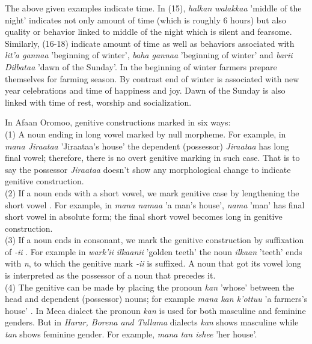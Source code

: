 \documentclass[11pt,a4paper]{article}
\begin{document}
	The above given examples indicate time. In (15), \emph{halkan walakkaa} 'middle of the night' indicates not only amount of time (which is roughly 6 hours) but also quality or behavior linked to middle of the night which is silent and fearsome. Similarly, (16-18) indicate amount of time as well as behaviors associated with \emph{lit'a gannaa} 'beginning of winter', \emph{baha gannaa} 'beginning of winter' and \emph{barii Dilbataa} 'dawn of the Sunday'. In the beginning of winter farmers prepare themselves for farming season. By contrast end of winter is associated with new year celebrations and time of happiness and joy. Dawn of the Sunday is also linked with time of rest, worship and socialization. 
		
	In Afaan Oromoo, genitive constructions marked in six ways:\\
	
	(1) A noun ending in long vowel marked by null morpheme. For example,  in \emph{mana Jiraataa} 'Jiraataa's house' the dependent (possessor) \emph{Jiraataa} has long final vowel; therefore, there is no overt genitive marking in such case. That is to say the possessor \emph{Jiraataa} doesn't show any morphological change to indicate genitive construction. \\
	
	(2) If a noun ends with a short vowel, we mark genitive case by lengthening the short vowel \cite[183]{gragg1976oromo,gobena2019verb}. For example, in \emph{mana namaa} 'a man's house', \emph{nama} 'man' has final short vowel in absolute form; the final short vowel becomes long in genitive construction. \\
	
	(3) If a noun ends in consonant, we mark the genitive construction by suffixation of \emph{-ii} \cite{gobena2019verb}. For example in \emph{wark'ii ilkaanii} 'golden teeth' the noun \emph{ilkaan} 'teeth' ends with \emph{n}, to which the genitive mark \emph{-ii} is suffixed. A noun that got its vowel long is interpreted as the possessor of a noun that precedes it. \\
	
	(4) The genitive can be made by placing the pronoun \emph{kan} 'whose' between the head and dependent (possessor) nouns; for example \emph{mana kan k'ottuu} 'a farmers's house' \cite[183]{gragg1976oromo}. In Meca dialect the pronoun \emph{kan} is used for both masculine and feminine genders. But in \emph{Harar, Borena and Tullama} dialects \emph{kan} shows masculine while \emph{tan} shows feminine gender. For example, \emph{mana tan ishee} 'her house'. \\
	
\end{document}
